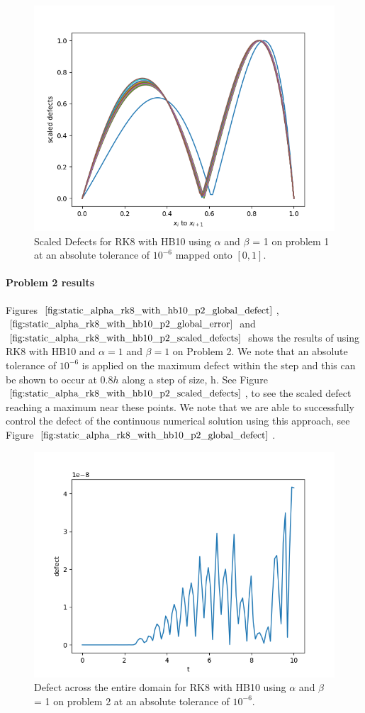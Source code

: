 \begin{figure}[H]
\centering
\includegraphics[width=0.7\linewidth]{./figures/static_alpha_rk8_with_hb10_p1_scaled_defects}
\caption{Scaled Defects for RK8 with HB10 using $\alpha$ and $\beta$ = 1 on problem 1 at an absolute tolerance of $10^{-6}$ mapped onto $[0, 1]$.}
\label{fig:static_alpha_rk8_with_hb10_p1_scaled_defects}
\end{figure}

\paragraph{Problem 2 results}
Figures $\ref{fig:static_alpha_rk8_with_hb10_p2_global_defect}$, $\ref{fig:static_alpha_rk8_with_hb10_p2_global_error}$ and $\ref{fig:static_alpha_rk8_with_hb10_p2_scaled_defects}$ shows the results of using RK8 with HB10 and $\alpha = 1$ and $\beta = 1$ on Problem 2. We note that an absolute tolerance of $10^{-6}$ is applied on the maximum defect within the step and this can be shown to occur at $0.8h$ along a step of size, h. See Figure $\ref{fig:static_alpha_rk8_with_hb10_p2_scaled_defects}$, to see the scaled defect reaching a maximum near these points. We note that we are able to successfully control the defect of the continuous numerical solution using this approach, see Figure $\ref{fig:static_alpha_rk8_with_hb10_p2_global_defect}$. 
\begin{figure}[H]
\centering
\includegraphics[width=0.7\linewidth]{./figures/static_alpha_rk8_with_hb10_p2_global_defect}
\caption{Defect across the entire domain for RK8 with HB10 using $\alpha$ and $\beta$ = 1 on problem 2 at an absolute tolerance of $10^{-6}$.}
\label{fig:static_alpha_rk8_with_hb10_p2_global_defect}
\end{figure}

